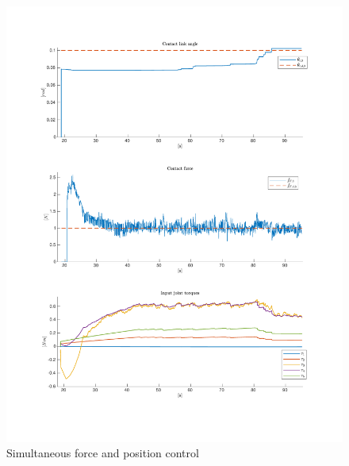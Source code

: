 \begin{figure}
    \centering
    \includegraphics[trim=2.1cm 2.1cm 2.1cm 2.1cm, clip=true, width=\textwidth]{figures/experiments/pos+f/pf-ref-3.pdf}
    \caption{Simultaneous force and position control}
    \label{fig:p+f}
\end{figure}